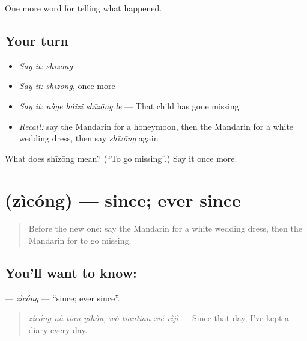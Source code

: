 \begin{grammarlens}[title={What you've built}]
One more word for telling what happened.
\end{grammarlens}

\subsection*{Your turn}
\begin{itemize}
\raggedright
  \item \emph{Say it:} \emph{shīzōng}
  \item \emph{Say it:} \emph{shīzōng}, once more
  \item \emph{Say it:} \emph{nàge háizi shīzōng le} — That child has gone missing.
  \item \emph{Recall:} say the Mandarin for a honeymoon, then the Mandarin for a white wedding dress, then say \emph{shīzōng} again
\end{itemize}

\begin{tcolorbox}[breakable,colback=teal!4,colframe=teal!35!black,title={Before you move on}]
What does shīzōng mean? (\textquotedblleft{}To go missing\textquotedblright{}.) Say it once more.
\end{tcolorbox}
\section[\texorpdfstring{\zh{自从} (zìcóng)}{自从 (zìcóng)}]{ (zìcóng) — since; ever since}

\label{lesson:ZH-C308-zicong}



\begin{quote}
Before the new one: say the Mandarin for a white wedding dress, then the Mandarin for to go missing.
\end{quote}

\subsection*{You'll want to know: }
\textbf{} — \emph{zìcóng} — \textquotedblleft{}since; ever since\textquotedblright{}.

\begin{quote}
\textbf{} \emph{zìcóng nà tiān yǐhòu, wǒ tiāntiān xiě rìjì} — Since that day, I've kept a diary every day.
\end{quote}

